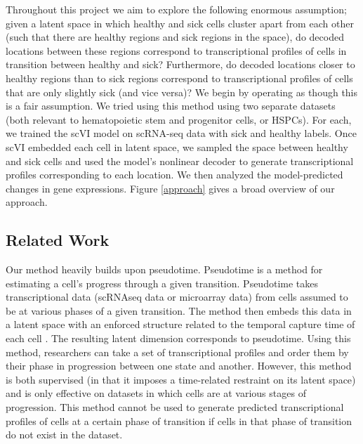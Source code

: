 \documentclass{article}
\begin{document}
Throughout this project we aim to explore the following enormous assumption; given a latent space in which healthy and sick cells cluster apart from each other (such that there are healthy regions and sick regions in the space), do decoded locations between these regions correspond to transcriptional profiles of cells in transition between healthy and sick?
Furthermore, do decoded locations closer to healthy regions than to sick regions correspond to transcriptional profiles of cells that are only slightly sick (and vice versa)?
We begin by operating as though this is a fair assumption.
We tried using this method using two separate datasets (both relevant to hematopoietic stem and progenitor cells, or HSPCs).
For each, we trained the scVI model on scRNA-seq data with sick and healthy labels.
Once scVI embedded each cell in latent space, we sampled the space between healthy and sick cells and used the model's nonlinear decoder to generate transcriptional profiles corresponding to each location.
We then analyzed the model-predicted changes in gene expressions.
Figure \ref*{approach} gives a broad overview of our approach.

\subsection{Related Work}
Our method heavily builds upon pseudotime.
Pseudotime \citep{reid_pseudotime_2016} is a method for estimating a cell's progress through a given transition.
Pseudotime takes transcriptional data (scRNAseq data or microarray data) from cells assumed to be at various phases of a given transition.
The method then embeds this data in a latent space with an enforced structure related to the temporal capture time of each cell \citep{reid_pseudotime_2016}.
The resulting latent dimension corresponds to pseudotime.
Using this method, researchers can take a set of transcriptional profiles and order them by their phase in progression between one state and another.
However, this method is both supervised (in that it imposes a time-related restraint on its latent space) and is only effective on datasets in which cells are at various stages of progression.
This method cannot be used to generate predicted transcriptional profiles of cells at a certain phase of transition if cells in that phase of transition do not exist in the dataset.
\end{document}
